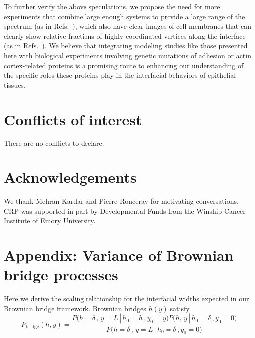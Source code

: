 \documentclass[twoside,twocolumn,9pt]{article}
\begin{document}
To further verify the above speculations, we propose the need for more experiments that combine large enough systems to provide a large range of the spectrum (as in Refs.~\cite{guan2023interfacial, heinrich2022self}), which also have clear images of cell membranes that can clearly show relative fractions of highly-coordinated vertices along the interface (as in Refs.~\cite{landsberg2009increased,iijima2020differential}). We believe that integrating modeling studies like those presented here with biological experiments involving genetic mutations of adhesion or actin cortex-related proteins is a promising route to enhancing our understanding of the specific roles these proteins play in the interfacial behaviors of epithelial tissues.




\section*{Conflicts of interest}
There are no conflicts to declare.

\section*{Acknowledgements}
We thank Mehran Kardar and Pierre Ronceray for motivating conversations. CRP was supported in part by Developmental Funds from the Winship Cancer Institute of Emory University.


\section{Appendix: Variance of Brownian bridge processes\label{sec:brownianBridgeAppendix}}
Here we derive the scaling relationship for the interfacial widths expected in our Brownian bridge framework. Brownian bridges $h(y)$ satisfy
\begin{equation}
    \label{eq::defn_BrownianBridge}
    {P}_{\text{bridge}}(h,y) = \frac{P\big(h=\delta\,,\,y=L\,|\,h_{0}=h\,,y_{0}=y\big)P\big(h,\,y\,|\,h_{0}=\delta\,,y_{0}=0\big)}{P\big(h=\delta\,,\,y=L\,|\,h_{0}=\delta\,,y_{0}=0\big)}
\end{equation}
\end{document}
